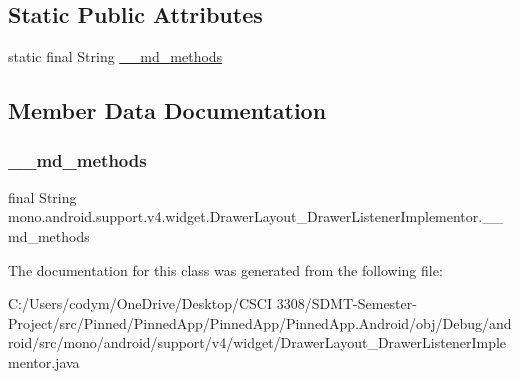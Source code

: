 \subsection*{Static Public Attributes}
\begin{DoxyCompactItemize}
\item 
static final String \hyperlink{classmono_1_1android_1_1support_1_1v4_1_1widget_1_1_drawer_layout___drawer_listener_implementor_a7a043c89da462068f6a987eb0eaaf8f3}{\+\_\+\+\_\+md\+\_\+methods}
\end{DoxyCompactItemize}


\subsection{Member Data Documentation}
\mbox{\label{classmono_1_1android_1_1support_1_1v4_1_1widget_1_1_drawer_layout___drawer_listener_implementor_a7a043c89da462068f6a987eb0eaaf8f3}} 
\subsubsection{\texorpdfstring{\+\_\+\+\_\+md\+\_\+methods}{\_\_md\_methods}}
{\footnotesize\ttfamily final String mono.\+android.\+support.\+v4.\+widget.\+Drawer\+Layout\+\_\+\+Drawer\+Listener\+Implementor.\+\_\+\+\_\+md\+\_\+methods\hspace{0.3cm}{\ttfamily [static]}}



The documentation for this class was generated from the following file\+:\begin{DoxyCompactItemize}
\item 
C\+:/\+Users/codym/\+One\+Drive/\+Desktop/\+C\+S\+C\+I 3308/\+S\+D\+M\+T-\/\+Semester-\/\+Project/src/\+Pinned/\+Pinned\+App/\+Pinned\+App/\+Pinned\+App.\+Android/obj/\+Debug/android/src/mono/android/support/v4/widget/Drawer\+Layout\+\_\+\+Drawer\+Listener\+Implementor.\+java\end{DoxyCompactItemize}
